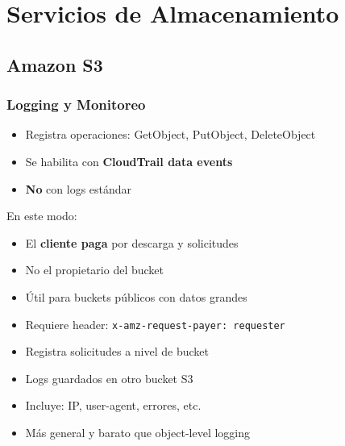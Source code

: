 \documentclass[12pt,a4paper]{report}
\newcommand{\awsservice}[1]{\textcolor{awsorange}{\textbf{#1}}}
\newcommand{\important}[1]{\textcolor{dangerred}{\textbf{#1}}}
\begin{document}
\newpage

\chapter{Servicios de Almacenamiento}

\section{Amazon S3}

\subsection{Logging y Monitoreo}

\begin{conceptbox}
\begin{itemize}
    \item Registra operaciones: GetObject, PutObject, DeleteObject
    \item Se habilita con \awsservice{CloudTrail data events}
    \item \important{No} con logs estándar
\end{itemize}
\end{conceptbox}

\begin{awsbox}
En este modo:
\begin{itemize}
    \item El \important{cliente paga} por descarga y solicitudes
    \item No el propietario del bucket
    \item Útil para buckets públicos con datos grandes
    \item Requiere header: \texttt{x-amz-request-payer: requester}
\end{itemize}
\end{awsbox}

\begin{tipbox}
\begin{itemize}
    \item Registra solicitudes a nivel de bucket
    \item Logs guardados en otro bucket S3
    \item Incluye: IP, user-agent, errores, etc.
    \item Más general y barato que object-level logging
\end{itemize}
\end{tipbox}
\end{document}
